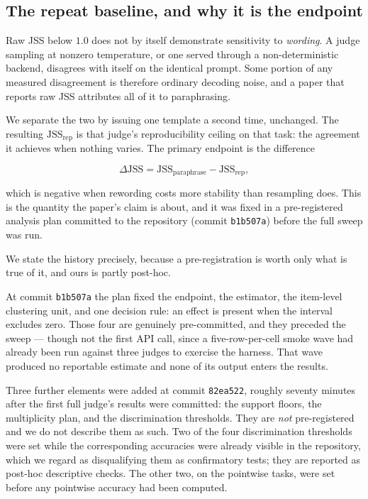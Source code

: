 \subsection{The repeat baseline, and why it is the endpoint}
\label{sec:repeat}

Raw JSS below $1.0$ does not by itself demonstrate sensitivity to \emph{wording}.
A judge sampling at nonzero temperature, or one served through a
non-deterministic backend, disagrees with itself on the identical prompt. Some
portion of any measured disagreement is therefore ordinary decoding noise, and a
paper that reports raw JSS attributes all of it to paraphrasing.

We separate the two by issuing one template a second time, unchanged. The
resulting $\mathrm{JSS}_{\text{rep}}$ is that judge's reproducibility ceiling on
that task: the agreement it achieves when nothing varies. The primary endpoint is
the difference

\[
  \Delta\mathrm{JSS} = \mathrm{JSS}_{\text{paraphrase}} - \mathrm{JSS}_{\text{rep}},
\]

which is negative when rewording costs more stability than resampling does. This
is the quantity the paper's claim is about, and it was fixed in a pre-registered
analysis plan committed to the repository (commit \texttt{b1b507a}) before the
full sweep was run.

We state the history precisely, because a pre-registration is worth only what is
true of it, and ours is partly post-hoc.

At commit \texttt{b1b507a} the plan fixed the endpoint, the estimator, the
item-level clustering unit, and one decision rule: an effect is present when the
interval excludes zero. Those four are genuinely pre-committed, and they preceded
the sweep --- though not the first API call, since a five-row-per-cell smoke wave
had already been run against three judges to exercise the harness. That wave
produced no reportable estimate and none of its output enters the results.

Three further elements were added at commit \texttt{82ea522}, roughly seventy
minutes after the first full judge's results were committed: the support floors,
the multiplicity plan, and the discrimination thresholds. They are \emph{not}
pre-registered and we do not describe them as such. Two of the four
discrimination thresholds were set while the corresponding accuracies were
already visible in the repository, which we regard as disqualifying them as
confirmatory tests; they are reported as post-hoc descriptive checks. The other
two, on the pointwise tasks, were set before any pointwise accuracy had been
computed.

